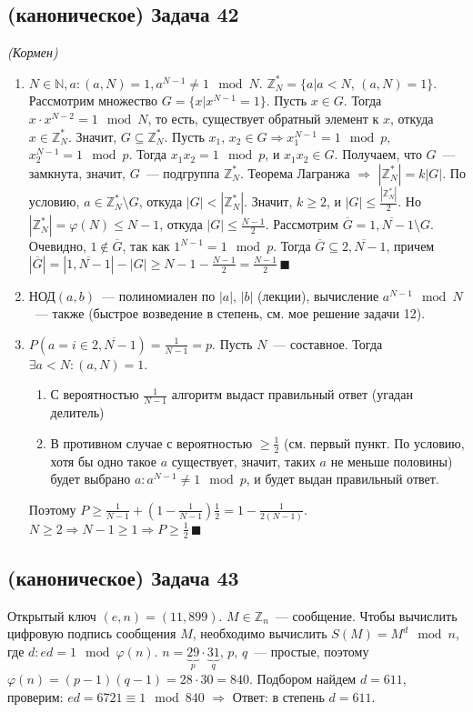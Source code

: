 \documentclass[a4paper]{article}
\newcommand{\ZZ}{\mathbb{Z}}
\newcommand{\NN}{\mathbb{N}}
\begin{document}
\subsection*{(каноническое) Задача 42}
{\em (Кормен)}
\begin{enumerate}
\item $N\in\NN,a\colon (a,N)=1, a^{N-1}\neq 1\mod N$. $\ZZ_N^*=\{a\big|a<N,\,(a,N)=1\}$. Рассмотрим множество $G=\{x\big|x^{N-1}=1\}$. Пусть $x\in G$. Тогда $x\cdot x^{N-2}=1\mod N$, то есть, существует обратный элемент к $x$, откуда $x\in \ZZ_N^*$. Значит, $G\subseteq \ZZ_N^*$. Пусть $x_1,\,x_2\in G\Rightarrow x_1^{N-1}=1\mod p$, $x_2^{N-1}=1\mod p$. Тогда $x_1x_2=1\mod p$, и $x_1x_2\in G$. Получаем, что $G$~--- замкнута, значит, $G$~--- подгруппа $\ZZ_N^*$. Теорема Лагранжа $\Rightarrow$ $|\ZZ_N^*|=k|G|$. По условию, $a\in\ZZ_N^*\setminus G$, откуда $|G|<|\ZZ_N^*|$. Значит, $k\geqslant 2$, и $|G|\leqslant \frac{|\ZZ_N^*|}{2}$. Но $|\ZZ_N^*|=\varphi(N)\leqslant N-1$, откуда $|G|\leqslant\frac{N-1}{2}$. Рассмотрим $\overline{G}=\overline{1,N-1}\setminus G$. Очевидно, $1\notin \overline{G}$, так как $1^{N-1}=1\mod p$. Тогда $\overline{G}\subseteq\overline{2,N-1}$, причем $|\overline{G}|=|\overline{1,N-1}|-|G|\geqslant N-1-\frac{N-1}{2}=\frac{N-1}{2}\,\blacksquare$
\item $\mbox{НОД}(a,b)$~--- полиномиален по $|a|,\,|b|$ (лекции), вычисление $a^{N-1}\mod N$~--- также (быстрое возведение в степень, см. мое решение задачи 12).
\item $P(a=i\in\overline{2,N-1})=\frac{1}{N-1}=p$. Пусть $N$~--- составное. Тогда $\exists a<N\colon (a,N)=1$.\begin{enumerate}
\item С вероятностью $\frac{1}{N-1}$ алгоритм выдаст правильный ответ (угадан делитель)
\item В противном случае с вероятностью $\geqslant \frac{1}{2}$ (см. первый пункт. По условию, хотя бы одно такое $a$ существует, значит, таких $a$ не меньше половины) будет выбрано $a\colon a^{N-1}\neq 1\mod p$, и будет выдан правильный ответ.
\end{enumerate}
Поэтому $P\geqslant \frac{1}{N-1}+(1-\frac{1}{N-1})\frac{1}{2}=1-\frac{1}{2(N-1)}$. $N\geqslant 2\Rightarrow N-1\geqslant 1\Rightarrow P\geqslant\frac{1}{2}\,\blacksquare$
\end{enumerate}
\subsection*{(каноническое) Задача 43}
Открытый ключ $(e,n)=(11, 899)$. $M\in\ZZ_n$~--- сообщение.\newline
Чтобы вычислить цифровую подпись сообщения $M$, необходимо вычислить $S(M)=M^d\mod n$,\newline
где $d\colon ed=1\mod \varphi(n)$. $n=\underbrace{29}_p\cdot \underbrace{31}_q$, $p,\,q$~--- простые, поэтому $\varphi(n)=(p-1)(q-1)=28\cdot 30=840$.\newline
Подбором найдем $d=611$, проверим: $ed=6721\equiv 1\mod 840$ $\Rightarrow$ Ответ: в степень $d=611$.
\end{document}
